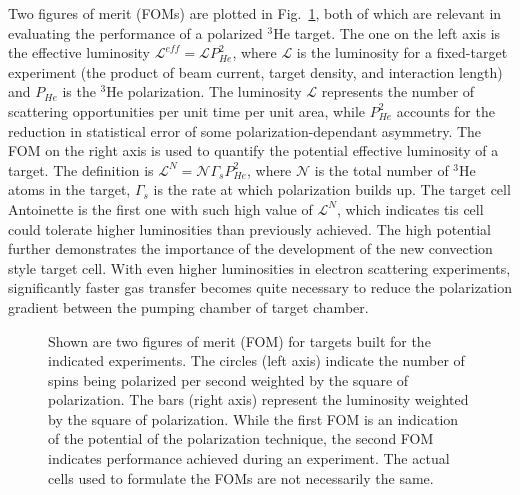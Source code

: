 Two figures of merit (FOMs) are plotted in Fig.~\ref{fig:foms}, both of which are relevant in evaluating the performance of a polarized $^{3}$He target. The one on the left axis is the effective luminosity $\mathcal{L}^{eff}=\mathcal{L}P_{He}^{2}$, where $\mathcal{L}$ is the luminosity for a fixed-target experiment (the product of beam current, target density, and interaction length) and $P_{He}$ is the $^{3}$He polarization. The luminosity $\mathcal{L}$ represents the number of scattering opportunities per unit time per unit area, while $P_{He}^{2}$ accounts for the reduction in statistical error of some polarization-dependant asymmetry. The FOM on the right axis is used to quantify the potential effective luminosity of a target. The definition is $\mathcal{L}^{N}=\mathcal{N}\Gamma_{s}P_{He}^{2}$, where $\mathcal{N}$ is the total number of $^{3}$He atoms in the target, $\Gamma_{s}$ is the rate at which polarization builds up. The target cell Antoinette is the first one with such high value of $\mathcal{L}^{N}$, which indicates tis cell could tolerate higher luminosities than previously achieved. The high potential further demonstrates the importance of the development of the new convection style target cell. With even higher luminosities in electron scattering experiments, significantly faster gas transfer becomes quite necessary to reduce the polarization gradient between the pumping chamber of target chamber.

\begin{figure}[t!]
	\centering
	\caption{{Shown are two figures of merit (FOM) for targets built for the indicated experiments.  The circles (left axis) indicate the number of spins being polarized per second weighted by the square of polarization.  The bars (right axis) represent the luminosity weighted by the square of polarization.  While the first FOM is an indication of the potential of the polarization technique, the second FOM indicates performance achieved during an experiment.  The actual cells used to formulate the FOMs are not necessarily the same.}}
	\label{fig:foms}
\end{figure}

